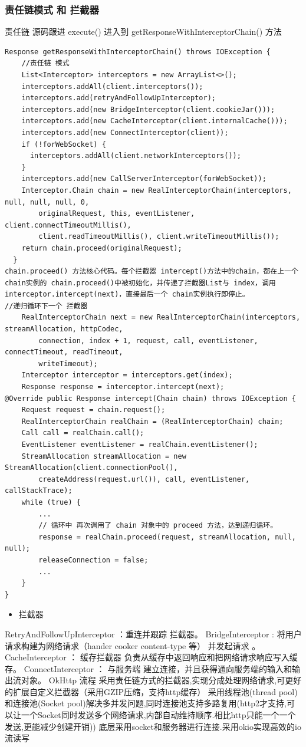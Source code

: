 \documentclass[9pt, b5paper]{article}
\begin{document}
\subsubsection{责任链模式 和 拦截器}
\label{sec-8-2-1}
责任链
源码跟进 execute() 进入到 getResponseWithInterceptorChain() 方法
\begin{verbatim}
Response getResponseWithInterceptorChain() throws IOException {
    //责任链 模式
    List<Interceptor> interceptors = new ArrayList<>();
    interceptors.addAll(client.interceptors());
    interceptors.add(retryAndFollowUpInterceptor);
    interceptors.add(new BridgeInterceptor(client.cookieJar()));
    interceptors.add(new CacheInterceptor(client.internalCache()));
    interceptors.add(new ConnectInterceptor(client));
    if (!forWebSocket) {
      interceptors.addAll(client.networkInterceptors());
    }
    interceptors.add(new CallServerInterceptor(forWebSocket));
    Interceptor.Chain chain = new RealInterceptorChain(interceptors, null, null, null, 0,
        originalRequest, this, eventListener, client.connectTimeoutMillis(),
        client.readTimeoutMillis(), client.writeTimeoutMillis());
    return chain.proceed(originalRequest);
  }
chain.proceed() 方法核心代码。每个拦截器 intercept()方法中的chain，都在上一个 chain实例的 chain.proceed()中被初始化，并传递了拦截器List与 index，调用interceptor.intercept(next)，直接最后一个 chain实例执行即停止。
//递归循环下一个 拦截器
    RealInterceptorChain next = new RealInterceptorChain(interceptors, streamAllocation, httpCodec,
        connection, index + 1, request, call, eventListener, connectTimeout, readTimeout,
        writeTimeout);
    Interceptor interceptor = interceptors.get(index);
    Response response = interceptor.intercept(next);
@Override public Response intercept(Chain chain) throws IOException {
    Request request = chain.request();
    RealInterceptorChain realChain = (RealInterceptorChain) chain;
    Call call = realChain.call();
    EventListener eventListener = realChain.eventListener();
    StreamAllocation streamAllocation = new StreamAllocation(client.connectionPool(),
        createAddress(request.url()), call, eventListener, callStackTrace);
    while (true) {
        ...
        // 循环中 再次调用了 chain 对象中的 proceed 方法，达到递归循环。
        response = realChain.proceed(request, streamAllocation, null, null);
        releaseConnection = false;
        ...
    }
}
\end{verbatim}
\begin{itemize}
\item 拦截器
\end{itemize}
RetryAndFollowUpInterceptor ：重连并跟踪 拦截器。
BridgeInterceptor : 将用户请求构建为网络请求（hander cooker content-type 等） 并发起请求 。
CacheInterceptor ： 缓存拦截器 负责从缓存中返回响应和把网络请求响应写入缓存。
ConnectInterceptor ： 与服务端 建立连接，并且获得通向服务端的输入和输出流对象。
OkHttp 流程
采用责任链方式的拦截器,实现分成处理网络请求,可更好的扩展自定义拦截器（采用GZIP压缩，支持http缓存）
采用线程池(thread pool)和连接池(Socket pool)解决多并发问题,同时连接池支持多路复用(http2才支持,可以让一个Socket同时发送多个网络请求,内部自动维持顺序.相比http只能一个一个发送,更能减少创建开销))
底层采用socket和服务器进行连接.采用okio实现高效的io流读写
\end{document}
